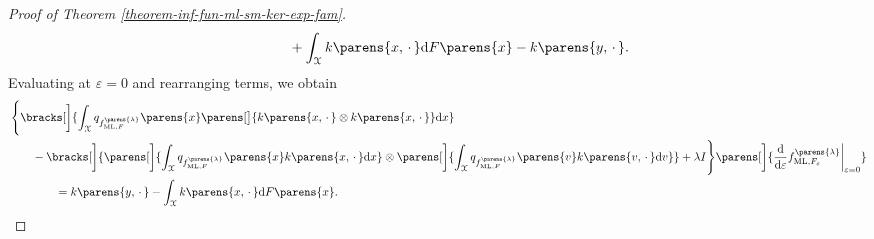 \begin{proof}[Proof of Theorem \ref{theorem-inf-fun-ml-sm-ker-exp-fam}]
\begin{align*}
		& \qquad \qquad + \int_{\calX} k \parens{x, \,\cdot\,} \diff F \parens{x} - k \parens{y, \,\cdot\,}. 
	\end{align*}
	Evaluating at $\varepsilon = 0$ and rearranging terms, we obtain 
	\begin{align*}
		& \, \Bigg\{\bracks[\bigg]{\int_{\calX} q_{f_{\ML, F}^{\parens{\lambda}}} \parens{x} \parens[\big]{k \parens{x, \,\cdot\,} \otimes k \parens{x, \,\cdot\,}} \diff x} \\ 
		& \qquad - \bracks[\bigg]{\parens[\bigg]{\int_{\calX} q_{f_{\ML, F}^{\parens{\lambda}}} \parens{x} k \parens{x, \,\cdot\,} \diff x} \otimes \parens[\bigg]{\int_{\calX} q_{f_{\ML, F}^{\parens{\lambda}}} \parens{v} k \parens{v, \,\cdot\,} \diff v}} + \lambda I \Bigg\} \parens[\bigg]{\frac{\diff}{\diff \varepsilon} f_{\ML, F_{\varepsilon}}^{\parens{\lambda}} \bigg\vert_{\varepsilon = 0}} \\ 
		& \qquad \qquad = k \parens{y, \,\cdot\,} - \int_{\calX} k \parens{x, \,\cdot\,} \diff F \parens{x}. 
	\end{align*}
	

\end{proof}
